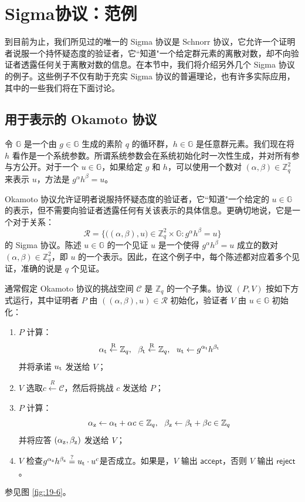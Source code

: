 \section{Sigma协议：范例}

到目前为止，我们所见过的唯一的 Sigma 协议是 Schnorr 协议，它允许一个证明者说服一个持怀疑态度的验证者，它``知道"一个给定群元素的离散对数，却不向验证者透露任何关于离散对数的信息。在本节中，我们将介绍另外几个 Sigma 协议的例子。这些例子不仅有助于充实 Sigma 协议的普遍理论，也有许多实际应用，其中的一些我们将在下面讨论。

\subsection{用于表示的 Okamoto 协议}\label{subsec:19-5-1}

令 $\mathbb{G}$ 是一个由 $g\in\mathbb{G}$ 生成的素阶 $q$ 的循环群，$h\in\mathbb{G}$ 是任意群元素。我们现在将 $h$ 看作是一个系统参数。所谓系统参数会在系统初始化时一次性生成，并对所有参与方公开。对于一个 $u\in\mathbb{G}$，如果给定 $g$ 和 $h$，可以使用一个数对 $(\alpha,\beta)\in\mathbb{Z}_q^2$ 来表示 $u$，方法是 $g^\alpha h^\beta=u$。

Okamoto 协议允许证明者说服持怀疑态度的验证者，它``知道"一个给定的 $u\in\mathbb{G}$ 的表示，但不需要向验证者透露任何有关该表示的具体信息。更确切地说，它是一个对于关系：
\begin{equation}\label{eq:19-11}
	\mathcal{R}=\bigg\lbrace
	\big((\alpha,\beta),u\big)\in\mathbb{Z}_q^2\times\mathbb{G}:g^\alpha h^\beta=u
	\bigg\rbrace
\end{equation}
的 Sigma 协议。陈述 $u\in\mathbb{G}$ 的一个见证 $u$ 是一个使得 $g^\alpha h^\beta=u$ 成立的数对 $(\alpha,\beta)\in\mathbb{Z}_q^2$，即 $u$ 的一个表示。因此，在这个例子中，每个陈述都对应着多个见证，准确的说是 $q$ 个见证。

通常假定 Okamoto 协议的挑战空间 $\mathcal{C}$ 是 $\mathbb{Z}_q$ 的一个子集。协议 $(P,V)$ 按如下方式运行，其中证明者 $P$ 由 $((\alpha,\beta),u)\in\mathcal{R}$ 初始化，验证者 $V$ 由 $u\in\mathbb{G}$ 初始化：
\begin{enumerate}
	\item $P$ 计算：
	$$
    \alpha_{\rm t}\overset{\rm R}\leftarrow\mathbb{Z}_q,~~
    \beta_{\rm t}\overset{\rm R}\leftarrow\mathbb{Z}_q,~~
    u_{\rm t}\leftarrow g^{\alpha_{\rm t}}h^{\beta_{\rm t}}
    $$
    并将承诺 $u_{\rm t}$ 发送给 $V$；
	\item $V$ 选取$c\overset{R}\leftarrow\mathcal{C}$，然后将挑战 $c$ 发送给 $P$；
	\item $P$ 计算：
	$$
    \alpha_{\rm z}\leftarrow\alpha_{\rm t}+\alpha c\in\mathbb{Z}_q,~~
    \beta_{\rm z}\leftarrow\beta_{\rm t}+\beta c\in\mathbb{Z}_q
    $$
    并将应答 $(\alpha_{\rm z}, \beta_{\rm z})$ 发送给 $V$；
	\item $V$ 检查$g^{\alpha_{\rm z}}h^{\beta_{\rm z}}\overset{?}=u_{\rm t}\cdot u^c$是否成立。如果是，$V$ 输出 $\mathsf{accept}$，否则 $V$ 输出 $\mathsf{reject}$。
\end{enumerate}
参见图 \ref{fig:19-6}。

